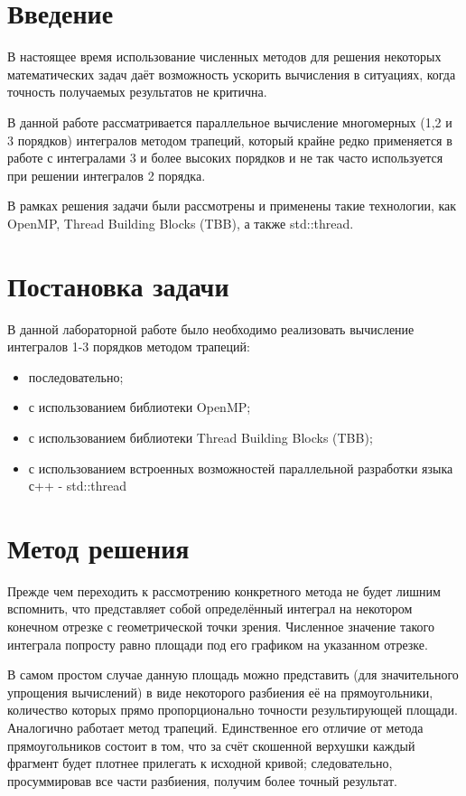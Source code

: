\documentclass{report}
\begin{document}
	\tableofcontents
	\newpage

\section*{Введение}
    В настоящее время использование численных методов для решения некоторых математических задач даёт возможность ускорить вычисления в ситуациях, когда точность получаемых результатов не критична.
    
    В данной работе рассматривается параллельное вычисление многомерных (1,2 и 3 порядков) интегралов методом трапеций, который крайне редко применяется в работе с интегралами 3 и более высоких порядков и не так часто используется при решении интегралов 2 порядка.
    
    В рамках решения задачи были рассмотрены и применены такие технологии, как OpenMP, Thread Building Blocks (TBB), а также std::thread.
\newpage
\section*{Постановка задачи}
В данной лабораторной работе было необходимо реализовать вычисление интегралов 1-3 порядков методом трапеций:
\begin{itemize}
\item последовательно;
\item с использованием библиотеки OpenMP;
\item с использованием библиотеки Thread Building Blocks (TBB);
\item с использованием встроенных возможностей параллельной разработки языка с++ - std::thread
\end{itemize}
\newpage
\section*{Метод решения}
\par Прежде чем переходить к рассмотрению конкретного метода не будет лишним вспомнить, что представляет собой определённый интеграл на некотором конечном отрезке с геометрической точки зрения. Численное значение такого интеграла попросту равно площади под его графиком на указанном отрезке. 

\par В самом простом случае данную площадь можно представить (для значительного упрощения вычислений) в виде некоторого разбиения её на прямоугольники, количество которых прямо пропорционально точности результирующей площади.
Аналогично работает метод трапеций. Единственное его отличие от метода прямоугольников состоит в том, что за счёт скошенной верхушки каждый фрагмент будет плотнее прилегать к исходной кривой; следовательно, просуммировав все части разбиения, получим более точный результат.
\end{document}
